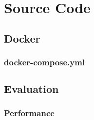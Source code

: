 %
\begin{appendices}
\label{ch:appendix}

\chapter{Source Code}
\label{ch:appendix:source}

\section{Docker}

\subsection{docker-compose.yml}



\section{Evaluation}

\subsection{Performance}






\end{appendices}
